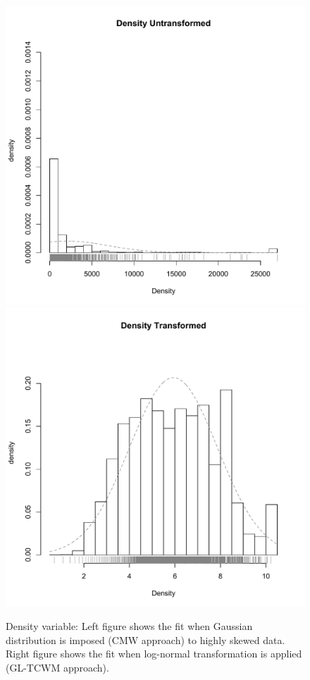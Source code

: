 \documentclass[11pt,letterpaper]{article}
\numberwithin{equation}{section}
\numberwithin{equation}{section}
\numberwithin{equation}{section}
\begin{document}
\begin{figure}[!htb]
\begin{center}
\includegraphics[scale=0.40]{Density.pdf}
\includegraphics[scale=0.40]{logDensity.pdf}
\end{center}
\caption{Density variable: Left figure shows the fit when Gaussian distribution is imposed (CMW approach) to highly skewed data. Right figure shows the fit when log-normal transformation is applied (GL-TCWM approach).}
\label{fig:vet1}
\end{figure}
\end{document}
